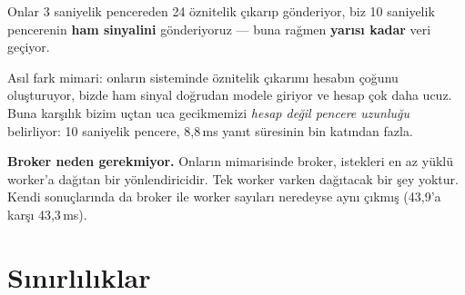 \documentclass[11pt,a4paper]{report}
\newcommand{\ms}{\,ms}
\begin{document}
\begin{bulgu}
Onlar 3 saniyelik pencereden 24 öznitelik çıkarıp gönderiyor, biz 10 saniyelik
pencerenin \textbf{ham sinyalini} gönderiyoruz --- buna rağmen \textbf{yarısı
kadar} veri geçiyor.

Asıl fark mimari: onların sisteminde öznitelik çıkarımı hesabın çoğunu
oluşturuyor, bizde ham sinyal doğrudan modele giriyor ve hesap çok daha ucuz.
Buna karşılık bizim uçtan uca gecikmemizi \emph{hesap değil pencere uzunluğu}
belirliyor: 10 saniyelik pencere, 8{,}8\ms{} yanıt süresinin bin katından fazla.

\textbf{Broker neden gerekmiyor.} Onların mimarisinde broker, istekleri en az
yüklü worker'a dağıtan bir yönlendiricidir. Tek worker varken dağıtacak bir şey
yoktur. Kendi sonuçlarında da broker ile worker sayıları neredeyse aynı çıkmış
(43{,}9'a karşı 43{,}3\ms).
\end{bulgu}

\chapter{Sınırlılıklar}
\end{document}
